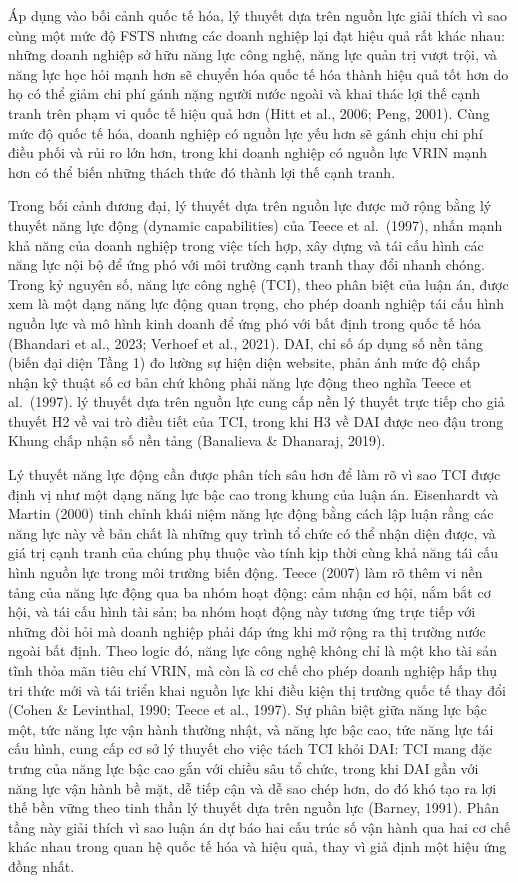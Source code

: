\documentclass[
  a4paper,
  13pt]{extreport}
\begin{document}
Áp dụng vào bối cảnh quốc tế hóa, lý thuyết dựa trên nguồn lực giải
thích vì sao cùng một mức độ FSTS nhưng các doanh nghiệp lại đạt hiệu
quả rất khác nhau: những doanh nghiệp sở hữu năng lực công nghệ, năng
lực quản trị vượt trội, và năng lực học hỏi mạnh hơn sẽ chuyển hóa quốc
tế hóa thành hiệu quả tốt hơn do họ có thể giảm chi phí gánh nặng người
nước ngoài và khai thác lợi thế cạnh tranh trên phạm vi quốc tế hiệu quả
hơn (Hitt et al., 2006; Peng, 2001). Cùng mức độ quốc tế hóa, doanh
nghiệp có nguồn lực yếu hơn sẽ gánh chịu chi phí điều phối và rủi ro lớn
hơn, trong khi doanh nghiệp có nguồn lực VRIN mạnh hơn có thể biến những
thách thức đó thành lợi thế cạnh tranh.

Trong bối cảnh đương đại, lý thuyết dựa trên nguồn lực được mở rộng bằng
lý thuyết năng lực động (dynamic capabilities) của Teece et al.~(1997),
nhấn mạnh khả năng của doanh nghiệp trong việc tích hợp, xây dựng và tái
cấu hình các năng lực nội bộ để ứng phó với môi trường cạnh tranh thay
đổi nhanh chóng. Trong kỷ nguyên số, năng lực công nghệ (TCI), theo phân
biệt của luận án, được xem là một dạng năng lực động quan trọng, cho
phép doanh nghiệp tái cấu hình nguồn lực và mô hình kinh doanh để ứng
phó với bất định trong quốc tế hóa (Bhandari et al., 2023; Verhoef et
al., 2021). DAI, chỉ số áp dụng số nền tảng (biến đại diện Tầng 1) đo
lường sự hiện diện website, phản ánh mức độ chấp nhận kỹ thuật số cơ bản
chứ không phải năng lực động theo nghĩa Teece et al.~(1997). lý thuyết
dựa trên nguồn lực cung cấp nền lý thuyết trực tiếp cho giả thuyết H2 về
vai trò điều tiết của TCI, trong khi H3 về DAI được neo đậu trong Khung
chấp nhận số nền tảng (Banalieva \& Dhanaraj, 2019).

Lý thuyết năng lực động cần được phân tích sâu hơn để làm rõ vì sao TCI
được định vị như một dạng năng lực bậc cao trong khung của luận án.
Eisenhardt và Martin (2000) tinh chỉnh khái niệm năng lực động bằng cách
lập luận rằng các năng lực này về bản chất là những quy trình tổ chức có
thể nhận diện được, và giá trị cạnh tranh của chúng phụ thuộc vào tính
kịp thời cùng khả năng tái cấu hình nguồn lực trong môi trường biến
động. Teece (2007) làm rõ thêm vi nền tảng của năng lực động qua ba nhóm
hoạt động: cảm nhận cơ hội, nắm bắt cơ hội, và tái cấu hình tài sản; ba
nhóm hoạt động này tương ứng trực tiếp với những đòi hỏi mà doanh nghiệp
phải đáp ứng khi mở rộng ra thị trường nước ngoài bất định. Theo logic
đó, năng lực công nghệ không chỉ là một kho tài sản tĩnh thỏa mãn tiêu
chí VRIN, mà còn là cơ chế cho phép doanh nghiệp hấp thụ tri thức mới và
tái triển khai nguồn lực khi điều kiện thị trường quốc tế thay đổi
(Cohen \& Levinthal, 1990; Teece et al., 1997). Sự phân biệt giữa năng
lực bậc một, tức năng lực vận hành thường nhật, và năng lực bậc cao, tức
năng lực tái cấu hình, cung cấp cơ sở lý thuyết cho việc tách TCI khỏi
DAI: TCI mang đặc trưng của năng lực bậc cao gắn với chiều sâu tổ chức,
trong khi DAI gần với năng lực vận hành bề mặt, dễ tiếp cận và dễ sao
chép hơn, do đó khó tạo ra lợi thế bền vững theo tinh thần lý thuyết dựa
trên nguồn lực (Barney, 1991). Phân tầng này giải thích vì sao luận án
dự báo hai cấu trúc số vận hành qua hai cơ chế khác nhau trong quan hệ
quốc tế hóa và hiệu quả, thay vì giả định một hiệu ứng đồng nhất.
\end{document}
